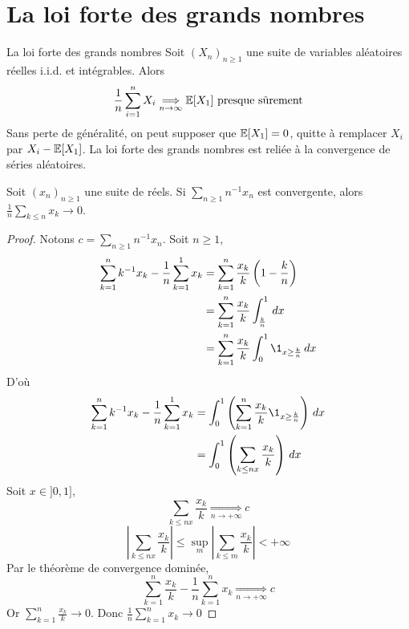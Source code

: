 \documentclass[]{report}
\begin{document}
    \section{La loi forte des grands nombres}

    \begin{tm}{La loi forte des grands nombres}{}
        Soit $(X_n)_{n\ge 1}$ une suite de variables aléatoires réelles i.i.d. et intégrables. Alors
        \[\frac{1}{n}\sum_{i=1}^{n}X_i\underset{n\to \infty}{\Longrightarrow}\mathbb{E}[X_1]\text{ presque sûrement}\]
        Sans perte de généralité, on peut supposer que $\mathbb{E}[X_1]=0$, quitte à remplacer $X_i$ par $X_i-\mathbb{E}[X_1]$. La loi forte des grands nombres est reliée à la convergence de séries aléatoires.
    \end{tm}

    \begin{lm}{}{}
        Soit $(x_n)_{n\ge 1}$ une suite de réels. Si $\sum_{n\ge 1}n^{-1}x_n$ est convergente, alors $\frac{1}{n}\sum_{k\le n}x_k\to 0$.
    \end{lm}

    \begin{proof}
        Notons $c=\sum_{n\ge 1}n^{-1}x_n$. Soit $n\ge 1$,
        \begin{align*}
            \sum_{k=1}^{n}k^{-1}x_k-\frac{1}{n}\sum_{k=1}^{1}x_k&=\sum_{k=1}^{n}\frac{x_k}{k}\left(1-\frac{k}{n}\right)\\
            &=\sum_{k=1}^{n}\frac{x_k}{k}\int_{\frac{k}{n}}^{1}\, dx\\
            &= \sum_{k=1}^{n}\frac{x_k}{k}\int_{0}^{1}\1_{x\ge \frac{k}{n}}\, dx
        \end{align*}
        D'où \begin{align*}
            \sum_{k=1}^{n}k^{-1}x_k-\frac{1}{n}\sum_{k=1}^{1}x_k&=\int_{0}^{1}\left(\sum_{k=1}^{n}\frac{x_k}{k}\1_{x\ge \frac{k}{n}}\right)\, dx\\
            &=\int_{0}^{1}\left(\sum_{k\le nx} \frac{x_k}{k}\right)\, dx
        \end{align*}
        Soit $x\in ]0,1]$,
        \[\sum_{k\le nx}\frac{x_k}{k}\underset{n\to +\infty}{\Longrightarrow}c\]
        \[|\sum_{k\le nx}\frac{x_k}{k}|\le \sup_m |\sum_{k\le m}\frac{x_k}{k}|<+\infty\]
        Par le théorème de convergence dominée,
        \[\sum_{k=1}^{n}\frac{x_k}{k}-\frac{1}{n}\sum_{k=1}^{n}x_k\underset{n\to +\infty}{\Longrightarrow} c\]
        Or $\sum_{k=1}^{n}\frac{x_k}{k}\longrightarrow 0$. Donc $\frac{1}{n}\sum_{k=1}^{n}x_k\to 0$
    \end{proof}
    
\end{document}
